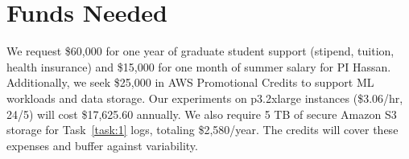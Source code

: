 \section*{Funds Needed}

We request \$60,000 for one year of graduate student support (stipend, tuition, health insurance) and \$15,000 for one month of summer salary for PI Hassan. Additionally, we seek \$25,000 in AWS Promotional Credits to support ML workloads and data storage. Our experiments on p3.2xlarge instances (\$3.06/hr, 24/5) will cost \$17,625.60 annually. We also require 5 TB of secure Amazon S3 storage for Task~\ref{task:1} logs, totaling \$2,580/year. The credits will cover these expenses and buffer against variability.

